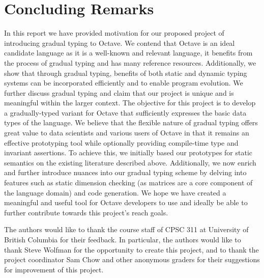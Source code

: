 \section{Concluding Remarks}
In this report we have provided motivation for our proposed project of introducing gradual typing to Octave. We contend that Octave is an ideal candidate language as it is a well-known and relevant language, it benefits from the process of gradual typing and has many reference resources. Additionally, we show that through gradual typing, benefits of both static and dynamic typing systems can be incorporated efficiently and to enable program evolution. We further discuss gradual typing and claim that our project is unique and is meaningful within the larger context. The objective for this project is to develop a gradually-typed variant for Octave that sufficiently expresses the basic data types of the language. We believe that the flexible nature of gradual typing offers great value to data scientists and various users of Octave in that it remains an effective prototyping tool while optionally providing compile-time type and invariant assertions. To achieve this, we initially based our prototypes for static semantics on the existing literature described above. Additionally, we now enrich and further introduce nuances into our gradual typing scheme by delving into features such as static dimension checking (as matrices are a core component of the language domain) and code generation. We hope we have created a meaningful and useful tool for Octave developers to use and ideally be able to further contribute towards this project's reach goals.

\appendix

\begin{acks}
    The authors would like to thank the course staff of CPSC 311 at University of British Columbia for their feedback. In particular, the authors would like to thank Steve Wolfman for the opportunity to create this project, and to thank the project coordinator Sam Chow and other anonymous graders for their suggestions for improvement of this project.
\end{acks}